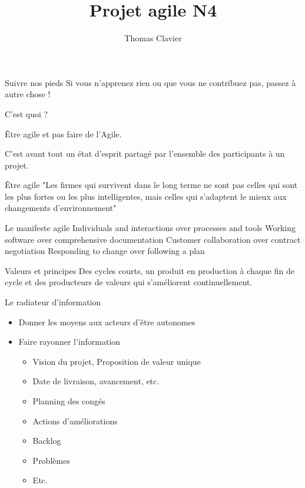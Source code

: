 \documentclass{beamer}
\title{Projet agile N4}
\author{
  Thomas Clavier 
}
\date{}
\begin{document}
\frame{\titlepage}

\begin{frame}{Suivre nos pieds}
  \Large Si vous n’apprenez rien ou que vous ne contribuez pas, passez à autre chose !
\end{frame}

\begin{frame}{C'est quoi ?}
 
  {\Large \alert{Être agile} et pas faire de l'Agile.}

  \vspace{6mm}
  C'est avant tout un état d'esprit partagé par l'ensemble des participants à un projet.
\end{frame}

\begin{frame}{Être agile}
  "Les firmes qui survivent dans le long terme ne sont pas celles qui sont les plus fortes ou les plus intelligentes, mais celles qui s'adaptent le mieux aux changements d'environnement"


\end{frame}

\begin{frame}{Le manifeste agile}
  \large
  \alert{Individuals and interactions} over processes and tools\newline
  \alert{Working software} over comprehensive documentation\newline
  \alert{Customer collaboration} over contract negotiation\newline
  \alert{Responding to change} over following a plan
\end{frame}

\begin{frame}{Valeurs et principes}
  \Large Des cycles courts, un produit en production à chaque fin de cycle et des producteurs de valeurs qui s'améliorent continuellement.
\end{frame}

\begin{frame}{Le radiateur d'information}
  \begin{itemize}
    \item Donner les moyens aux acteurs d'être autonomes
    \item Faire rayonner l'information
    
    \begin{itemize}
      \item Vision du projet, Proposition de valeur unique
      \item Date de livraison, avancement, etc.
      \item Planning des congés
      \item Actions d'améliorations
      \item Backlog
      \item Problèmes
      \item Etc.
    \end{itemize}
  \end{itemize}
\end{frame}
\end{document}
